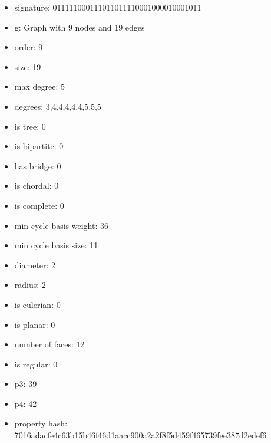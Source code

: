 \newpage
\begin{figure}
\end{figure}
\begin{itemize}
\item signature: 011111000111011011110001000010001011
\item g: Graph with 9 nodes and 19 edges
\item order: 9
\item size: 19
\item max degree: 5
\item degrees: 3,4,4,4,4,4,5,5,5
\item is tree: 0
\item is bipartite: 0
\item has bridge: 0
\item is chordal: 0
\item is complete: 0
\item min cycle basis weight: 36
\item min cycle basis size: 11
\item diameter: 2
\item radius: 2
\item is eulerian: 0
\item is planar: 0
\item number of faces: 12
\item is regular: 0
\item p3: 39
\item p4: 42
\item property hash: 7016adacfe4c63b15b46f46d1aacc900a2a2f8f5d459f465739fee387d2edef6
\end{itemize}
